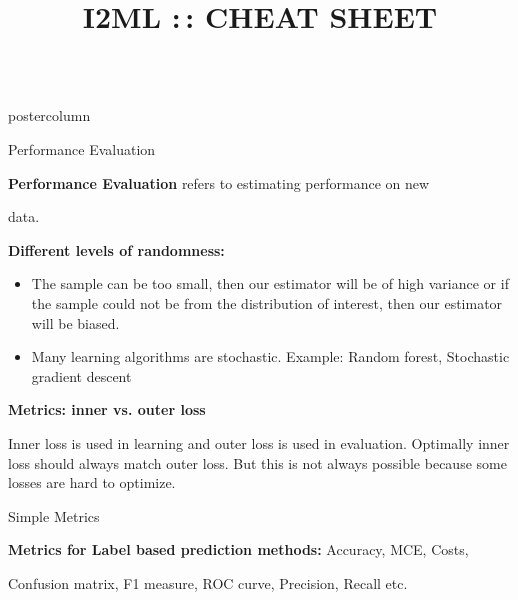 \documentclass{beamer}
\title{I2ML :\,: CHEAT SHEET} %
\newlength{\columnheight} %
\begin{document}
\begin{frame}[fragile]{}
\begin{columns}
	\begin{column}{.31\textwidth}
		\begin{beamercolorbox}[center]{postercolumn}
			\begin{minipage}{.98\textwidth}
				\parbox[t][\columnheight]{\textwidth}{
					\begin{myblock}{Performance Evaluation}

						\begin{codebox}
							\textbf{Performance Evaluation} refers to estimating performance on new
						\end{codebox}
						
						\begin{codebox}
							data.
						\end{codebox}
						
					    \vspace*{1ex}
						
						\begin{codebox}
							\textbf{Different levels of randomness:}
						\end{codebox}
						
						\begin{itemize}[$\bullet$]
						  \setlength{\itemindent}{+.3in}
              \item The sample can be too small, then our estimator will be of high variance or if the sample could not be from the distribution of interest, then our estimator will be biased.
               \item Many learning algorithms are stochastic. Example: Random forest, Stochastic gradient descent
            \end{itemize}
						
						\vspace*{1ex}
	
						\begin{codebox}
							 \textbf{Metrics: inner vs. outer loss}
						\end{codebox}
						Inner loss is used in learning and outer loss is used in evaluation. Optimally inner loss should always match outer loss. But this is not always possible because some losses are hard to optimize. 
				
					\end{myblock}
					\begin{myblock}{Simple Metrics}
					\begin{codebox}
							\textbf{Metrics for Label based prediction methods: }Accuracy, MCE, Costs,
						\end{codebox}
						\begin{codebox}
							 Confusion matrix, F1 measure, ROC curve, Precision, Recall etc.
						\end{codebox}
						

\end{myblock}}
\end{minipage}
\end{beamercolorbox}
\end{column}
\end{columns}
\end{frame}
\end{document}
